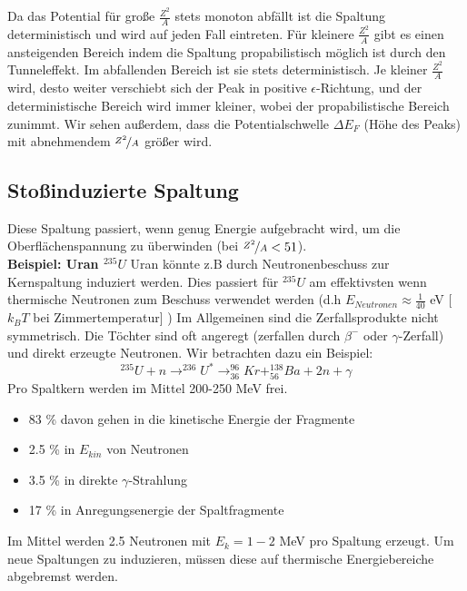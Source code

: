 \documentclass[Ex4_Zusammenfassung.tex]{subfiles}
\begin{document}
Da das Potential für große $\frac{Z^2}{A}$ stets monoton abfällt ist die Spaltung deterministisch und wird auf jeden Fall eintreten. Für kleinere $\frac{Z^2}{A}$ gibt es einen ansteigenden Bereich indem die Spaltung propabilistisch möglich ist durch den Tunneleffekt. Im abfallenden Bereich ist sie stets deterministisch. Je kleiner $\frac{Z^2}{A}$ wird, desto weiter verschiebt sich der Peak in positive $\epsilon$-Richtung, und der deterministische Bereich wird immer kleiner, wobei der propabilistische Bereich zunimmt. Wir sehen außerdem, dass die Potentialschwelle $\Delta E_F$ (Höhe des Peaks) mit abnehmendem $\nicefrac{Z^2}{A}$ größer wird. 

\subsection{Stoßinduzierte Spaltung}
Diese Spaltung passiert, wenn genug Energie aufgebracht wird, um die Oberflächenspannung zu überwinden (bei $\nicefrac{Z^2}{A} < 51$). \\ \newline
\textbf{Beispiel: Uran $^{235} U$} \newline
Uran könnte z.B durch Neutronenbeschuss zur Kernspaltung induziert werden. Dies passiert für $^{235} U$ am effektivsten wenn thermische Neutronen zum Beschuss verwendet werden (d.h $E_{Neutronen} \approx \frac{1}{40}$ eV [$k_B  T$ bei Zimmertemperatur] ) \newline
Im Allgemeinen sind die Zerfallsprodukte nicht symmetrisch. Die Töchter sind oft angeregt (zerfallen durch $\beta^-$ oder $\gamma$-Zerfall) und direkt erzeugte Neutronen. Wir betrachten dazu ein Beispiel:
\begin{equation}
^ {235} U + n \rightarrow ^{236} U ^*  \rightarrow ^{96}_{36} Kr + ^{138}_{56} Ba + 2n + \gamma
\end{equation}
Pro Spaltkern werden im Mittel 200-250 MeV frei.
\begin{itemize}
\item 83 \% davon gehen in die kinetische Energie der Fragmente
\item 2.5 \% in $E_{kin}$ von Neutronen
\item 3.5 \% in direkte $\gamma$-Strahlung 
\item 17 \% in Anregungsenergie der Spaltfragmente
\end{itemize}  
Im Mittel werden 2.5 Neutronen mit $E_k = 1-2$ MeV pro Spaltung erzeugt. Um neue Spaltungen zu induzieren, müssen diese auf thermische Energiebereiche abgebremst werden. 
\end{document}
